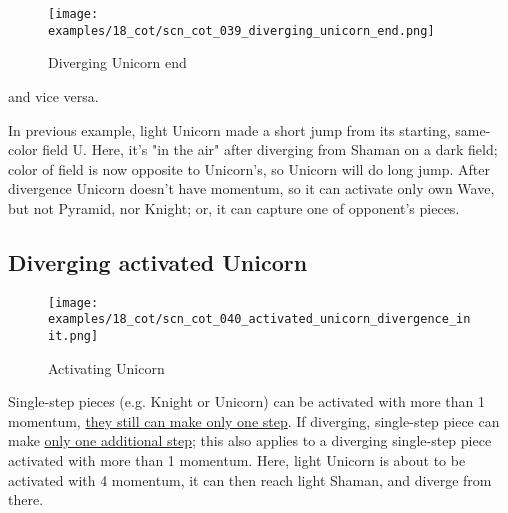 \clearpage %

\vspace*{-2.1\baselineskip}
\noindent
\begin{figure}[!h]
\texttt{[image: examples/18\_cot/scn\_cot\_039\_diverging\_unicorn\_end.png]}
\vspace*{-1.3\baselineskip}
\caption{Diverging Unicorn end}
\label{fig:scn_cot_039_diverging_unicorn_end}
\end{figure}

\vspace*{-0.4\baselineskip}
\noindent
and vice versa.

In previous example, light Unicorn made a short jump from its starting, same-color
field U. Here, it's "in the air" after diverging from Shaman on a dark field; color
of field is now opposite to Unicorn's, so Unicorn will do long jump.
After divergence Unicorn doesn't have momentum, so it can activate only own Wave,
but not Pyramid, nor Knight; or, it can capture one of opponent's pieces.

\clearpage %

\subsection*{Diverging activated Unicorn}
\label{sec:Conquest of Tlalocan/Divergence/Diverging activated Unicorn}

\vspace*{-1.4\baselineskip}
\noindent
\begin{figure}[!h]
\texttt{[image: examples/18\_cot/scn\_cot\_040\_activated\_unicorn\_divergence\_init.png]}
\vspace*{-1.3\baselineskip}
\caption{Activating Unicorn}
\label{fig:scn_cot_040_activated_unicorn_divergence_init}
\end{figure}

\vspace*{-0.5\baselineskip}
Single-step pieces (e.g. Knight or Unicorn) can be activated with more than 1 momentum,
\hyperref[fig:scn_mv_039_single_step_piece_momentum]{they still can make only one step}.
If diverging, single-step piece can make
\hyperref[fig:scn_cot_038_diverging_unicorn_init]{only one additional step}; this also
applies to a diverging single-step piece activated with more than 1 momentum.\newline
\indent
Here, light Unicorn is about to be activated with 4 momentum, it can then reach light
Shaman, and diverge from there.

